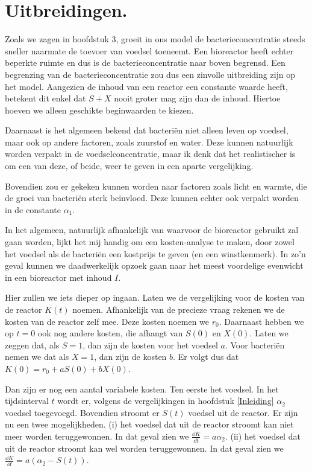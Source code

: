
\chapter{Uitbreidingen.}
\label{Uitbreidingen}

Zoals we zagen in hoofdstuk 3, groeit in ons model de bacterieconcentratie steeds sneller naarmate de toevoer van voedsel toeneemt. Een bioreactor heeft echter beperkte ruimte en dus is de bacterieconcentratie naar boven begrensd. Een begrenzing van de bacterieconcentratie zou dus een zinvolle uitbreiding zijn op het model. Aangezien de inhoud van een reactor een constante waarde heeft, betekent dit enkel dat $S + X$ nooit groter mag zijn dan de inhoud. Hiertoe hoeven we alleen geschikte beginwaarden te kiezen. 

Daarnaast is het algemeen bekend dat bacteri\"en niet alleen leven op voedsel, maar ook op andere factoren, zoals zuurstof en water. Deze kunnen natuurlijk worden verpakt in de voedselconcentratie, maar ik denk dat het realistischer is om een van deze, of beide, weer te geven in een aparte vergelijking. 

Bovendien zou er gekeken kunnen worden naar factoren zoals licht en warmte, die de groei van bacteri\"en sterk be\"invloed. Deze kunnen echter ook verpakt worden in de constante $\alpha_1$. 

In het algemeen, natuurlijk afhankelijk van waarvoor de bioreactor gebruikt zal gaan worden, lijkt het mij handig om een kosten-analyse te maken, door zowel het voedsel als de bacteri\"en een kostprijs te geven (en een winstkenmerk). In zo'n geval kunnen we daadwerkelijk opzoek gaan naar het meest voordelige evenwicht in een bioreactor met inhoud $I$. 

Hier zullen we iets dieper op ingaan. Laten we de vergelijking voor de kosten van de reactor $K(t)$ noemen. Afhankelijk van de precieze vraag rekenen we de kosten van de reactor zelf mee. Deze kosten noemen we $r_0$. Daarnaast hebben we op $t = 0$ ook nog andere kosten, die afhangt van $S(0)$ en $X(0)$. Laten we zeggen dat, als $S = 1$, dan zijn de kosten voor het voedsel $a$. Voor bacteri\"en nemen we dat als $X = 1$, dan zijn de kosten $b$. Er volgt dus dat $K(0) = r_0 + aS(0) + bX(0)$. 

Dan zijn er nog een aantal variabele kosten. Ten eerste het voedsel. In het tijdsinterval $t$ wordt er, volgens de vergelijkingen in hoofdstuk \ref{Inleiding} $\alpha_2$ voedsel toegevoegd. Bovendien stroomt er $S(t)$ voedsel uit de reactor. Er zijn nu een twee mogelijkheden. (i) het voedsel dat uit de reactor stroomt kan niet meer worden teruggewonnen. In dat geval zien we $\frac{\dd K}{\dd t} = a \alpha_2$. (ii) het voedsel dat uit de reactor stroomt kan wel worden teruggewonnen. In dat geval zien we $\frac{\dd K}{\dd t} = a (\alpha_2 - S(t))$. 

